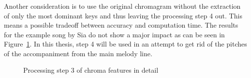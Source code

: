 \begin{figure}[htbp]
	\centering
\end{figure}
\FloatBarrier
\noindent Another consideration is to use the original chromagram without the extraction of only the most dominant keys and thus leaving the processing step 4 out. This means a possible tradeoff between accuracy and computation time. The results for the example song by Sia do not show a major impact as can be seen in Figure~\ref{fig:nomax}. In this thesis, step 4 will be used in an attempt to get rid of the pitches of the accompaniment from the main melody line.
\begin{figure}[htbp]
	\centering
	\caption{Processing step 3 of chroma features in detail}
	\label{fig:nomax}
\end{figure}

